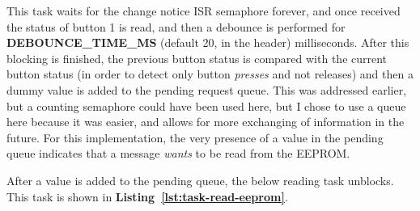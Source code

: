 \documentclass[a4paper, 12pt]{article}
\begin{document}
This task waits for the change notice ISR semaphore forever, and once received the status of button 1 is read, and then a debounce is performed for \textbf{DEBOUNCE\_TIME\_MS} (default 20, in the header) milliseconds. After this blocking is finished, the previous button status is compared with the current button status (in order to detect only button \emph{presses} and not releases) and then a dummy value is added to the pending request queue. This was addressed earlier, but a counting semaphore could have been used here, but I chose to use a queue here because it was easier, and allows for more exchanging of information in the future. For this implementation, the very presence of a value in the pending queue indicates that a message \emph{wants} to be read from the EEPROM.

After a value is added to the pending queue, the below reading task unblocks. This task is shown in \textbf{Listing~\ref{lst:task-read-eeprom}}.
\end{document}
